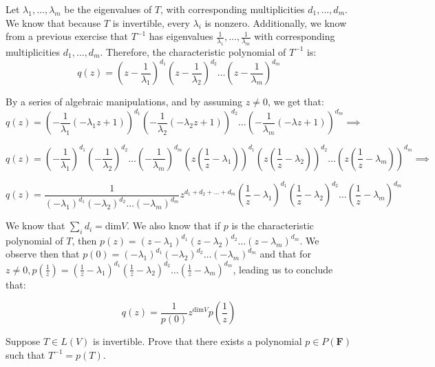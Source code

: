 \begin{solution}

    Let $\lambda_1, \ldots, \lambda_m$ be the eigenvalues of $T$, with corresponding multiplicities $d_1, \ldots, d_m$. We know that because $T$ is invertible, every $\lambda_i$ is nonzero. Additionally, we know from a previous exercise that $T^{-1}$ has eigenvalues $\frac{1}{\lambda_1}, \ldots, \frac{1}{\lambda_m}$ with corresponding multiplicities $d_1, \ldots, d_m$. Therefore, the characteristic polynomial of $T^{-1}$ is:
    $$q(z) = (z- \frac{1}{\lambda_1})^{d_1}(z- \frac{1}{\lambda_2})^{d_2}\ldots(z- \frac{1}{\lambda_m})^{d_m}$$

    By a series of algebraic manipulations, and by assuming $z \neq 0$, we get that:
    $$q(z) = (-\frac{1}{\lambda_1}(-\lambda_1 z + 1))^{d_1}(-\frac{1}{\lambda_2}(-\lambda_2 z + 1))^{d_2} \dots (-\frac{1}{\lambda_m}(-\lambda z + 1))^{d_m} \implies$$
    
    $$q(z) = (-\frac{1}{\lambda_1})^{d_1}(-\frac{1}{\lambda_2})^{d_2}\ldots(-\frac{1}{\lambda_m})^{d_m}(z(\frac{1}{z} - \lambda_1))^{d_1}(z(\frac{1}{z} - \lambda_2))^{d_2} \ldots(z(\frac{1}{z} - \lambda_m))^{d_m} \implies$$

    $$q(z) = \frac{1}{(-\lambda_1)^{d_1}(-\lambda_2)^{d_2}\ldots(-\lambda_m)^{d_m}}z^{d_1 + d_2 + \ldots + d_m}(\frac{1}{z} - \lambda_1)^{d_1}(\frac{1}{z} - \lambda_2)^{d_2} \ldots (\frac{1}{z} - \lambda_m)^{d_m}$$

    We know that $\sum_{i}d_i = \text{dim} V$. We also know that if $p$ is the characteristic polynomial of $T$, then $p(z) = (z - \lambda_1)^{d_1}(z - \lambda_2)^{d_2}\ldots(z-\lambda_m)^{d_m}$. We observe then that $p(0) = (-\lambda_1)^{d_1}(-\lambda_2)^{d_2}\ldots(-\lambda_m)^{d_m}$ and that for $z \neq 0, p(\frac{1}{z}) = (\frac{1}{z} - \lambda_1)^{d_1}(\frac{1}{z} - \lambda_2)^{d_2}\ldots(\frac{1}{z} - \lambda_m)^{d_m}$, leading us to conclude that:

    $$q(z) = \frac{1}{p(0)}z^{\text{dim} V}p(\frac{1}{z})$$
\end{solution}

\begin{exercise}{11}
    Suppose $T \in L(V)$ is invertible. Prove that there exists a polynomial $p \in P(\mathbf{F})$ such that $T^{-1} = p(T)$.
\end{exercise}


